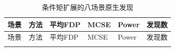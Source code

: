 \documentclass{sufethesismas}
\begin{document}
{
\footnotesize
\begin{longtable}[]{@{}
  >{\raggedright\arraybackslash}p{}
  >{\raggedright\arraybackslash}p{}
  >{\raggedright\arraybackslash}p{}
  >{\raggedright\arraybackslash}p{}
  >{\raggedright\arraybackslash}p{}
  >{\raggedright\arraybackslash}p{}@{}}
\caption{条件矩扩展的八场景原生发现}\tabularnewline
\toprule\noalign{}
\begin{minipage}[b]{\linewidth}\raggedright
场景
\end{minipage} & \begin{minipage}[b]{\linewidth}\raggedright
方法
\end{minipage} & \begin{minipage}[b]{\linewidth}\raggedright
平均FDP
\end{minipage} & \begin{minipage}[b]{\linewidth}\raggedright
MCSE
\end{minipage} & \begin{minipage}[b]{\linewidth}\raggedright
Power
\end{minipage} & \begin{minipage}[b]{\linewidth}\raggedright
发现数
\end{minipage} \\
\midrule\noalign{}
\endfirsthead
\toprule\noalign{}
\begin{minipage}[b]{\linewidth}\raggedright
场景
\end{minipage} & \begin{minipage}[b]{\linewidth}\raggedright
方法
\end{minipage} & \begin{minipage}[b]{\linewidth}\raggedright
平均FDP
\end{minipage} & \begin{minipage}[b]{\linewidth}\raggedright
MCSE
\end{minipage} & \begin{minipage}[b]{\linewidth}\raggedright
Power
\end{minipage} & \begin{minipage}[b]{\linewidth}\raggedright
发现数
\end{minipage} \\
\midrule\noalign{}
\endhead
\bottomrule\noalign{}
\endlastfoot

\end{longtable}}
\end{document}

